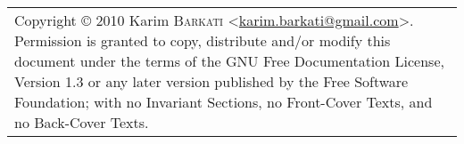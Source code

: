 \documentclass[a4paper, landscape, 10pt]{article}
\newcommand{\email}[1]{\href{mailto:#1}{\textsf{#1}}}
\begin{document}
\begin{multicols}{3}
\begin{tabularx}{9cm}{>{\tt}l X}
  \end{tabularx}
  
  \medskip{} 
  \noindent{}
  \begin{tabularx}{9cm}{X}
    \tiny{Copyright \copyright{ 2010} Karim \textsc{Barkati} <\email{karim.barkati@gmail.com}>. Permission is granted to copy, distribute and/or modify this document under the terms of the GNU Free Documentation License, Version 1.3 or any later version published by the Free Software Foundation; with no Invariant Sections, no Front-Cover Texts, and no Back-Cover Texts.}
  \end{tabularx}

  \columnbreak

\end{multicols}
\end{document}
